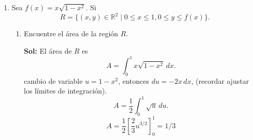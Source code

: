 \documentclass[letterpaper,12pt]{article}
\theoremstyle{plain}
\theoremstyle{definition}
\begin{document}
\begin{enumerate}
\begin{enumerate}
    \item Calcule el área de la región $\mathcal{R}$.

\color{blue}
\textbf{Sol:} Los ceros de $f$ se obtienen de
\[
1-x^2=0 \;\Rightarrow\; x=\pm1.
\]
Como $f(x)\ge 0$ en $[-1,1]$, el área es
\[
A=\int_{-1}^{1} f(x)\,dx.
\]
Usando que $\displaystyle f(x)=-1+\dfrac{2}{1+x^2}$,
\[
A=\int_{-1}^{1}\left(-1+\frac{2}{1+x^2}\right)dx.
\]
\[
A=\left[-x+2\arctan x\right]_{-1}^{1}
\]
\[
A=\big(-1+2\arctan 1\big)-\big(1-2\arctan 1\big)
= -2+4\arctan 1.
\]
como $\arctan 1=\dfrac{\pi}{4}$,
\[
A=\pi-2
\]
\color{black}
    
\item Calcule el volumen del sólido de revolución obtenido al rotar la región $\mathcal{R}$.

\textbf{Hint:} Puede usar que $\displaystyle \int \frac{1}{(1+x^2)^2} \, dx = \frac{1}{2} \left( \frac{x}{x^2+1} + \arctan(x) \right) + C$

\color{blue}
\textbf{Sol:} al tratarse de un sólido de revolución:
\begin{align*}
V(\mathcal{R}) &= \pi \int_{-1}^{1} f^2(x) \, dx = \pi \int_{-1}^{1} \left( \frac{2}{1+x^2} - 1 \right)^2 dx \\
&= \pi \int_{-1}^{1} \left( \frac{4}{(1+x^2)^2} - \frac{4}{1+x^2} + 1 \right) dx \\
&= \pi \left( \frac{4}{2} \left( \frac{x}{x^2+1} + \arctan(x) \right) - 4 \arctan(x) + x \right) \bigg|_{-1}^{1} \\
&= \pi \left( 2 \left( \frac{1}{2} + \frac{\pi}{4} \right) - 4 \frac{\pi}{4} + 1 \right. \\
&\quad - \left. \left( 2 \left( -\frac{1}{2} - \frac{\pi}{4} \right) + 4 \frac{\pi}{4} - 1 \right) \right) \\
&= \pi \left( 1 + \pi/2 - \pi + 1 + 1 + \pi/2 - \pi + 1 \right) \\
&= \pi (4 - \pi) > 0 \quad (\text{¡ojo con eso!})
\end{align*}
\color{black}

\end{enumerate}

    
    \item Sea $f(x) = x\sqrt{1 - x^2}$. Si
    \[
    R = \{(x, y) \in \mathbb{R}^2 \mid 0 \le x \le 1, 0 \le y \le f(x)\}.
    \]
    \begin{enumerate}
        \item Encuentre el área de la región $R$.

\color{blue}
\textbf{Sol:} El área de $R$ es
\[
A=\int_{0}^{1} x\sqrt{1-x^2}\,dx.
\]
cambio de variable $u=1-x^2$, entonces $du=-2x\,dx$, (recordar ajustar los límites de integración).
\[
A=\frac12\int_{0}^{1} \sqrt{u}\,du.
\]
\[
A=\frac12\left[\frac{2}{3}u^{3/2}\right]_{0}^{1}=1/3
\]
\color{black}
        

\end{enumerate}
\end{enumerate}
\end{document}
